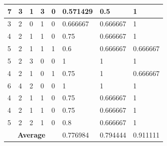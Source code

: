 \begin{small}
\begin{longtable}{|l|l|l|l|l|l|l|l|}
\multicolumn{1}{|l|}{ 7 } & 3           & 1           & 3           & 0           & 0.571429          & 0.5                & 1               \\ \hline
\multicolumn{1}{|l|}{ 3 } & 2           & 0           & 1           & 0           & 0.666667          & 0.666667           & 1               \\ \hline
\multicolumn{1}{|l|}{ 4 } & 2           & 1           & 1           & 0           & 0.75              & 0.666667           & 1               \\ \hline
\multicolumn{1}{|l|}{ 5 } & 2           & 1           & 1           & 1           & 0.6               & 0.666667           & 0.666667        \\ \hline
\multicolumn{1}{|l|}{ 5 } & 2           & 3           & 0           & 0           & 1                 & 1                  & 1               \\ \hline
\multicolumn{1}{|l|}{ 4 } & 2           & 1           & 0           & 1           & 0.75              & 1                  & 0.666667        \\ \hline
\multicolumn{1}{|l|}{ 6 } & 4           & 2           & 0           & 0           & 1                 & 1                  & 1               \\ \hline
\multicolumn{1}{|l|}{ 4 } & 2           & 1           & 1           & 0           & 0.75              & 0.666667           & 1               \\ \hline
\multicolumn{1}{|l|}{ 4 } & 2           & 1           & 1           & 0           & 0.75              & 0.666667           & 1               \\ \hline
\multicolumn{1}{|l|}{ 5 } & 2           & 2           & 1           & 0           & 0.8               & 0.666667           & 1               \\ \hline
\multicolumn{5}{|c|}{\textbf{Average}}                                                         & 0.776984          & 0.794444           & 0.911111        \\ \hline
\end{longtable}
\end{small}
\endgroup

